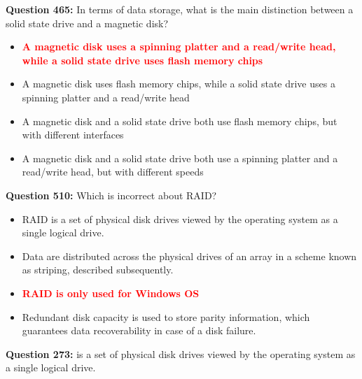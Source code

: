 \documentclass[12pt,a4paper]{article}
\begin{document}
\vspace{0.5cm}

\vspace{0.5cm}

\textbf{Question 465:} In terms of data storage, what is the main distinction between a solid state drive and a magnetic disk?

\begin{itemize}
    \item[\textbf{A.}] \textcolor{red}{\textbf{A magnetic disk uses a spinning platter and a read/write head, while a solid state drive uses flash memory chips}}
    \item[\textbf{B.}] A magnetic disk uses flash memory chips, while a solid state drive uses a spinning platter and a read/write head
    \item[\textbf{C.}] A magnetic disk and a solid state drive both use flash memory chips, but with different interfaces
    \item[\textbf{D.}] A magnetic disk and a solid state drive both use a spinning platter and a read/write head, but with different speeds
\end{itemize}

\vspace{0.5cm}

\vspace{0.5cm}

\textbf{Question 510:} Which is incorrect about RAID?

\begin{itemize}
    \item[\textbf{A.}] RAID is a set of physical disk drives viewed by the operating system as a single logical drive.
    \item[\textbf{B.}] Data are distributed across the physical drives of an array in a scheme known as striping, described subsequently.
    \item[\textbf{C.}] \textcolor{red}{\textbf{RAID is only used for Windows OS}}
    \item[\textbf{D.}] Redundant disk capacity is used to store parity information, which guarantees data recoverability in case of a disk failure.
\end{itemize}

\vspace{0.5cm}

\vspace{0.5cm}

\textbf{Question 273:} \underline{\hspace{1.5cm}} is a set of physical disk drives viewed by the operating system as a single logical drive.
\end{document}
